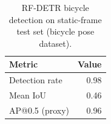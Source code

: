 \begin{table}[t]
\centering
\caption{RF-DETR bicycle detection on static-frame test set (bicycle pose dataset).}
\begin{tabular}{lr}
\toprule
Metric & Value \\
\midrule
Detection rate & 0.98 \\
Mean IoU & 0.46 \\
AP@0.5 (proxy) & 0.96 \\
\bottomrule
\end{tabular}
\end{table}